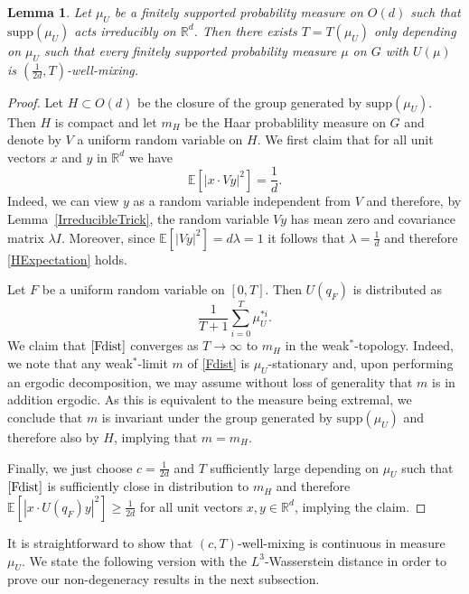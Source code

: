 \documentclass[10pt, english,oneside,reqno]{amsart}
\theoremstyle{plain}
\newtheorem{lemma}[theorem]{Lemma}
\theoremstyle{remark}
\numberwithin{equation}{section}
\numberwithin{figure}{section}
\newcommand{\R}{\mathbb{R}}
\newcommand{\E}{\mathbb{E}}
\newcommand{\Haarof}[1]{m_{#1}}
\begin{document}
\begin{lemma}\label{Ufixeduniformmixing}
    Let $\mu_U$ be a finitely supported probability measure on $O(d)$ such that $\mathrm{supp}(\mu_U)$ acts irreducibly on $\R^d$. Then there exists $T = T(\mu_U)$ only depending on $\mu_U$ such that every finitely supported probability measure $\mu$ on $G$ with $U(\mu)$ is $(\frac{1}{2d},T)$-well-mixing.
\end{lemma}

\begin{proof}
    Let $H \subset O(d)$ be the closure of the group generated by $\mathrm{supp}(\mu_U)$. Then $H$ is compact and let $\Haarof{H}$ be the Haar probablility measure on $G$ and denote by $V$ a uniform random variable on $H$. We first claim that for all unit vectors $x$ and $y$ in $\R^d$ we have 
    \begin{equation}\label{HExpectation}
        \E[|x\cdot Vy|^2] = \frac{1}{d}.
    \end{equation}
    Indeed, we can view $y$ as a random variable independent from $V$ and therefore, by Lemma~\ref{IrreducibleTrick}, the random variable $Vy$ has mean zero and covariance matrix $\lambda I$. Moreover, since $\E[|Vy|^2] = d\lambda = 1$ it follows that $\lambda = \frac{1}{d}$ and therefore \eqref{HExpectation} holds. 
    
    Let $F$ be a uniform random variable on $[0,T]$. Then $U(q_F)$ is distributed as 
    \begin{equation}\label{Fdist}
        \frac{1}{T + 1} \sum_{i = 0}^T \mu_U^{*i}.
    \end{equation}
    We claim that $\eqref{Fdist}$ converges as $T\to \infty$ to $\Haarof{H}$ in the weak$^{*}$-topology. Indeed, we note that any weak$^{*}$-limit $m$ of \eqref{Fdist} is $\mu_U$-stationary and, upon performing an ergodic decomposition, we may assume without loss of generality that $m$ is in addition ergodic. As this is equivalent to the measure being extremal, we conclude that $m$ is invariant under the group generated by $\mathrm{supp}(\mu_U)$ and therefore also by $H$, implying that $m = m_H$.

    Finally, we just choose $c = \frac{1}{2d}$ and $T$ sufficiently large depending on $\mu_U$ such that $\eqref{Fdist}$ is sufficiently close in distribution to $\Haarof{H}$ and therefore $\E[|x\cdot U(q_F)y|^2] \geq \frac{1}{2d}$ for all unit vectors $x,y \in \R^d$, implying the claim.
\end{proof}

It is straightforward to show that $(c,T)$-well-mixing is continuous in measure $\mu_U$. We state the following version with the $L^3$-Wasserstein distance in order to prove our non-degeneracy results in the next subsection.
\end{document}
